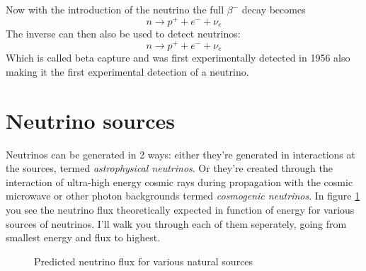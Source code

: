 \documentclass[11pt,a4paper,faculty=we,language=en,doctype=report]{cls/ugent-doc}
\begin{document}
Now with the introduction of the neutrino the full $\beta^-$ decay
becomes
\begin{equation}
	n \rightarrow p^+ + e^- + \nu_e
\end{equation}
The inverse can then also be used to detect neutrinos:
\begin{equation}
	n \rightarrow p^+ + e^- + \nu_e
\end{equation}
Which is called beta capture and was first experimentally detected in 1956
\cite{BetaCapture} also making it the first experimental detection of a
neutrino.
\section{Neutrino sources}
Neutrinos can be generated in 2 ways: either they're generated in
interactions at the sources, termed \textit{astrophysical neutrinos}. Or
they're created through the interaction of ultra-high energy cosmic rays during
propagation with the cosmic microwave or other photon backgrounds termed
\textit{cosmogenic neutrinos}. 
In figure \ref{figure:Neutrino fluxes} you see the neutrino flux theoretically expected 
in function of energy for various sources of neutrinos. I'll walk you through each of
them seperately, going from smallest energy and flux to highest.
\begin{figure}
	\centering
	\caption{Predicted neutrino flux for various natural sources}
	\label{figure:Neutrino fluxes}
\end{figure}
\end{document}
